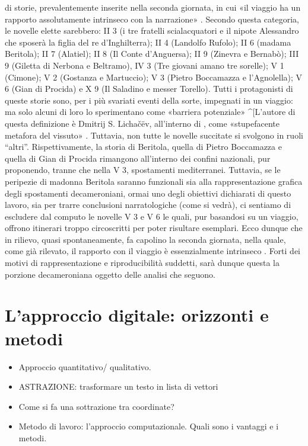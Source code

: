 di storie, prevalentemente inserite nella seconda giornata, in cui «il
viaggio ha un rapporto assolutamente intrinseco con la narrazione»
\autocite[p.~549]{asor1992}. Secondo questa categoria, le novelle elette
sarebbero: II 3 (i tre fratelli scialacquatori e il nipote Alessandro
che sposerà la figlia del re d'Inghilterra); II 4 (Landolfo Rufolo); II
6 (madama Beritola); II 7 (Alatiel); II 8 (Il Conte d'Anguersa); II 9
(Zinevra e Bernabò); III 9 (Giletta di Nerbona e Beltramo), IV 3 (Tre
giovani amano tre sorelle); V 1 (Cimone); V 2 (Gostanza e Martuccio); V
3 (Pietro Boccamazza e l'Agnolella); V 6 (Gian di Procida) e X 9 (Il
Saladino e messer Torello). Tutti i protagonisti di queste storie sono,
per i più svariati eventi della sorte, impegnati in un viaggio: ma solo
alcuni di loro lo sperimentano come «barriera potenziale»
\^{}{[}L'autore di questa definizione è Dmitrij S. Lichačëv, all'interno
di \autocite[pp.~26-39]{lotman1973}, come «stupefacente metafora del
vissuto» \autocite[p.~550]{asor1992}. Tuttavia, non tutte le novelle
succitate si svolgono in ruoli ``altri''. Rispettivamente, la storia di
Beritola, quella di Pietro Boccamazza e quella di Gian di Procida
rimangono all'interno dei confini nazionali, pur proponendo, tranne che
nella V 3, spostamenti mediterranei. Tuttavia, se le peripezie di
madonna Beritola saranno funzionali sia alla rappresentazione grafica
degli spostamenti decameroniani, ormai uno degli obiettivi dichiarati di
questo lavoro, sia per trarre conclusioni narratologiche (come si
vedrà), ci sentiamo di escludere dal computo le novelle V 3 e V 6 le
quali, pur basandosi su un viaggio, offrono itinerari troppo
circoscritti per poter risultare esemplari. Ecco dunque che in rilievo,
quasi spontaneamente, fa capolino la seconda giornata, nella quale, come
già rilevato, il rapporto con il viaggio è essenzialmente intrinseco
\autocite{zatti2004}. Forti dei motivi di rappresentazione e
riproducibilità suddetti, sarà dunque questa la porzione decameroniana
oggetto delle analisi che seguono.

\section{L'approccio digitale: orizzonti e
metodi}\label{lapproccio-digitale-orizzonti-e-metodi}

\begin{itemize}
\tightlist
\item
  Approccio quantitativo/ qualitativo.
\item
  ASTRAZIONE: trasformare un testo in lista di vettori
\item
  Come si fa una sottrazione tra coordinate?
\item
  Metodo di lavoro: l'approccio computazionale. Quali sono i vantaggi e
  i metodi.
\end{itemize}

